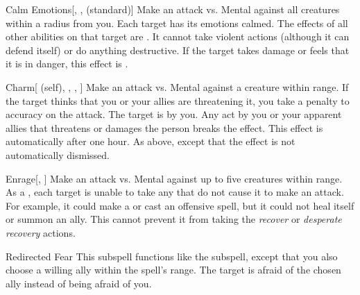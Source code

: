 \begin{ability}[\nth{2}]{Calm Emotions}[, ,  (standard)]
Make an attack vs. Mental against all creatures within a \areamed radius from you.
\hit Each target has its emotions calmed.
The effects of all other  abilities on that target are .
It cannot take violent actions (although it can defend itself) or do anything destructive.
If the target takes damage or feels that it is in danger, this effect is .
\end{ability}
\vspace{0.25em}


\begin{ability}[\nth{2}]{Charm}[ (self), , , ]
Make an attack vs. Mental against a creature within \rngmed range.
If the target thinks that you or your allies are threatening it, you take a  penalty to accuracy on the attack.
\hit The target is \charmed by you.
Any act by you or your apparent allies that threatens or damages the  person breaks the effect.
This effect is automatically  after one hour.
\crit As above, except that the effect is not automatically dismissed.
\end{ability}
\vspace{0.25em}


\begin{ability}[\nth{2}]{Enrage}[, ]
Make an attack vs. Mental against up to five creatures within \rngmed range.
\hit As a , each target is unable to take any  that do not cause it to make an attack.
For example, it could make a  or cast an offensive spell, but it could not heal itself or summon an ally.
This cannot prevent it from taking the \textit{recover} or \textit{desperate recovery} actions.
\end{ability}
\vspace{0.25em}


\begin{ability}[\nth{2}]{Redirected Fear}
This subspell functions like the  subspell, except that you also choose a willing ally within the spell's range.
The target is afraid of the chosen ally instead of being afraid of you.
\end{ability}
\vspace{0.25em}



